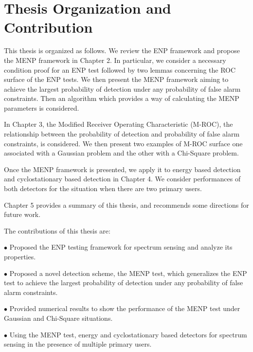 \section{Thesis Organization and Contribution}
This thesis is organized as follows. We review the ENP framework and propose the MENP framework in Chapter 2. In particular,  we consider  a necessary condition proof for an  ENP test followed by  two lemmas concerning the ROC surface of the ENP tests. 
We then present the MENP framework aiming to  achieve the largest probability of detection  under any probability of false alarm constraints.
Then an algorithm which provides a way of calculating the MENP parameters is considered. 

In Chapter 3, the Modified Receiver Operating Characteristic (M-ROC), the relationship between the probability of detection and probability of false alarm constraints, is considered.  We then present two examples of M-ROC surface one associated with a Gaussian problem and the other with a Chi-Square problem. 

Once the MENP framework is presented, we apply it to energy based detection and cyclostationary based detection in Chapter 4. We consider  performances of both detectors for the situation when there are two primary users.  

Chapter 5 provides a summary of this thesis, and recommends some directions for future work.  

The contributions of this thesis are:

$\bullet$ Proposed the ENP testing framework for spectrum sensing and analyze its properties.  

$\bullet$ Proposed a novel detection scheme,  the MENP test, which generalizes the ENP  test to  achieve the largest probability of detection under any probability of false alarm constraints. 

$\bullet$ Provided numerical results to show the performance of the MENP test under Gaussian and Chi-Square situations. 

$\bullet$ Using the MENP test, energy and cyclostationary based detectors for spectrum sensing in the presence of multiple primary users. 
